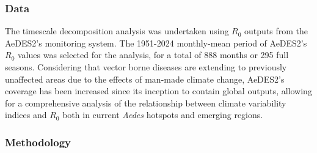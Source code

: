 \documentclass[10pt,twocolumn]{wlscirep}
\begin{document}
\subsubsection{Data} \label{sec-methods-1-data}
The timescale decomposition analysis was undertaken using $R_0$ outputs from the AeDES2's monitoring system. The 1951-2024 monthly-mean period of AeDES2's $R_0$ values was selected for the analysis, for a total of 888 months or 295 full seasons. Considering that vector borne diseases are extending to previously unaffected areas due to the effects of man-made climate change, AeDES2's coverage has been increased since its inception to contain global outputs, allowing for a comprehensive analysis of the relationship between climate variability indices and $R_0$ both in current \textit{Aedes} hotspots and emerging regions.

\subsubsection{Methodology} \label{sec-methods-1-methodology}
\end{document}
